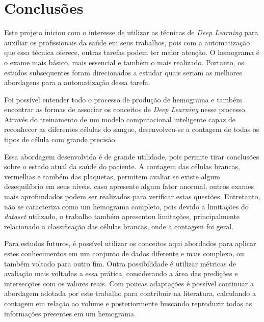 \chapter{Conclusões}
\label{chap:conclusoes}

Este projeto iniciou com o interesse de utilizar as técnicas de \emph{Deep Learning} para auxiliar os profissionais da saúde em seus trabalhos, pois com a automatização que essa técnica oferece, outras tarefas podem ter maior atenção. O hemograma é o exame mais básico, mais essencial e também o mais realizado. Portanto, os estudos subsequentes foram direcionados a estudar quais seriam as melhores abordagens para a automatização dessa tarefa.

Foi possível entender todo o processo de produção de hemograma e também encontrar as formas de associar os conceitos de \emph{Deep Learning} nesse processo. Através do treinamento de um modelo computacional inteligente capaz de reconhecer as diferentes células do sangue, desenvolveu-se a contagem de todas os tipos de célula com grande precisão.

Essa abordagem desenvolvida é de grande utilidade, pois permite tirar conclusões sobre o estado atual da saúde do paciente. A contagem das células brancas, vermelhas e também das plaquetas, permitem avaliar se existe algum desequilíbrio em seus níveis, caso apresente algum fator anormal, outros exames mais aprofundados podem ser realizados para verificar estas questões. Entretanto, não se caracteriza como um hemograma completo, pois devido a limitações do \emph{dataset} utilizado, o trabalho também apresentou limitações, principalmente relacionado a classificação das células brancas, onde a contagem foi geral.

Para estudos futuros, é possível utilizar os conceitos aqui abordados para aplicar estes conhecimentos em um conjunto de dados diferente e mais complexo, ou também voltado para outro fim. Outra possibilidade é utilizar métricas de avaliação mais voltadas a essa prática, considerando a área das predições e intersecções com os valores reais. Com poucas adaptações é possível continuar a abordagem adotada por este trabalho para contribuir na literatura, calculando a contagem em relação ao volume e posteriormente buscando reproduzir todas as informações presentes em um hemograma.
